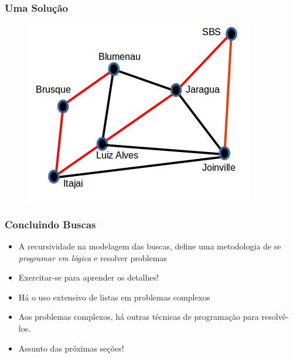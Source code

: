 \begin{frame}[fragile]
\frametitle{Uma Soluç\~ao}

\begin{figure}[!htb]
\centering
\includegraphics[width=.8\textwidth, height=0.567\textheight]{figures/mapa02SC.jpg}
\end{figure}

\end{frame}




\begin{frame}[fragile]
\frametitle{Concluindo Buscas}

\begin{block}{}
\begin{itemize}
  
  
  \item A recursividade na modelagem das buscas, define uma metodologia de se \textit{programar em lógica} e resolver problemas
    \pause
  \item Exercitar-se para aprender os detalhes!
    \pause
  \item Há o uso extensivo de listas em problemas complexos
  
  \pause
  \item Aos problemas complexos, há outras técnicas de programação
  para resolvê-los.
  
  
  \pause
  \item Assunto das próximas seções!
\end{itemize}

\end{block}

\end{frame}





